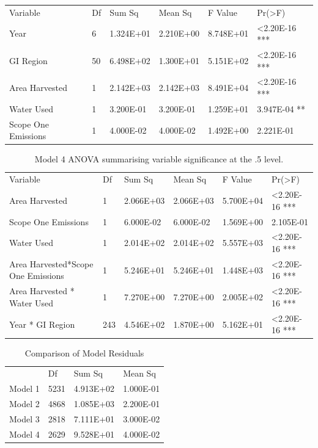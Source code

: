 \documentclass[review,12pt,authoryear]{elsarticle}
\begin{document}
\begin{linenumbers}
\begin{table}[]
  \label{tab:tab8}
  \begin{tabular}{llllll}
  Variable            & Df & Sum Sq    & Mean Sq   & F Value   & Pr(\textgreater{}F)    \\
  Year                & 6  & 1.324E+01 & 2.210E+00 & 8.748E+01 & \textless 2.20E-16 *** \\
  GI Region           & 50 & 6.498E+02 & 1.300E+01 & 5.151E+02 & \textless 2.20E-16 *** \\
  Area Harvested      & 1  & 2.142E+03 & 2.142E+03 & 8.491E+04 & \textless 2.20E-16 *** \\
  Water Used          & 1  & 3.200E-01 & 3.200E-01 & 1.259E+01 & 3.947E-04 **           \\
  Scope One Emissions & 1  & 4.000E-02 & 4.000E-02 & 1.492E+00 & 2.221E-01             
  \end{tabular}
\end{table}

\begin{table}[]
\label{tab:tab9}
\caption{Model 4 ANOVA summarising variable significance at the .5 level.}
\begin{tabular}{llllll}
Variable            & Df  & Sum Sq    & Mean Sq   & F Value   & Pr(\textgreater{}F)    \\
Area Harvested      & 1   & 2.066E+03 & 2.066E+03 & 5.700E+04 & \textless 2.20E-16 *** \\
Scope One Emissions & 1   & 6.000E-02 & 6.000E-02 & 1.569E+00 & 2.105E-01              \\
Water Used          & 1   & 2.014E+02 & 2.014E+02 & 5.557E+03 & \textless 2.20E-16 *** \\
Area Harvested*Scope One Emissions & 1 & 5.246E+01 & 5.246E+01 & 1.448E+03 & \textless 2.20E-16 *** \\
Area Harvested * Water Used        & 1 & 7.270E+00 & 7.270E+00 & 2.005E+02 & \textless 2.20E-16 *** \\
Year * GI Region    & 243 & 4.546E+02 & 1.870E+00 & 5.162E+01 & \textless 2.20E-16 ***
\end{tabular}
\end{table}

\begin{table}[]
\label{tab:tab 10}
\caption{Comparison of Model Residuals}
\begin{tabular}{llll}
      & Df   & Sum Sq    & Mean Sq   \\
Model 1 & 5231 & 4.913E+02 & 1.000E-01 \\
Model 2 & 4868 & 1.085E+03 & 2.200E-01 \\
Model 3 & 2818 & 7.111E+01 & 3.000E-02 \\
Model 4 & 2629 & 9.528E+01 & 4.000E-02
\end{tabular}
\end{table}


\end{linenumbers}
\end{document}
